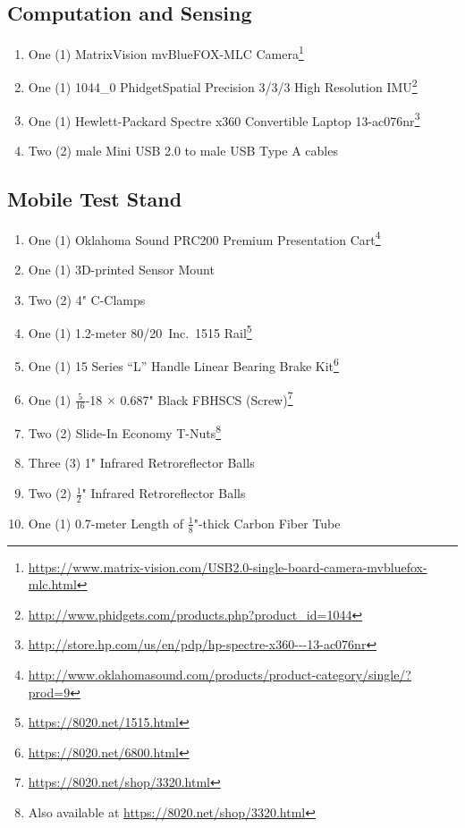\subsection{Computation and Sensing}
\begin{enumerate}
\item One (1) MatrixVision mvBlueFOX-MLC Camera\footnote{\url{https://www.matrix-vision.com/USB2.0-single-board-camera-mvbluefox-mlc.html}}
\item One (1) 1044\_0 PhidgetSpatial Precision 3/3/3 High Resolution IMU\footnote{\url{http://www.phidgets.com/products.php?product_id=1044}}
\item One (1) Hewlett-Packard Spectre x360 Convertible Laptop 13-ac076nr\footnote{\url{http://store.hp.com/us/en/pdp/hp-spectre-x360---13-ac076nr}}
\item Two (2) male Mini USB 2.0 to male USB Type A cables
\end{enumerate}

\subsection{Mobile Test Stand}
\begin{enumerate}
\item One (1) Oklahoma Sound PRC200 Premium Presentation Cart\footnote{\url{http://www.oklahomasound.com/products/product-category/single/?prod=9}}
\item One (1) 3D-printed Sensor Mount
\item Two (2) 4" C-Clamps
\item One (1) 1.2-meter 80/20\textsuperscript{\textregistered}~Inc.\ 1515 Rail\footnote{\url{https://8020.net/1515.html}}
\item One (1) 15 Series ``L'' Handle Linear Bearing Brake Kit\footnote{\url{https://8020.net/6800.html}}
\item One (1) $\frac{5}{16}$-18 $\times$ 0.687" Black FBHSCS (Screw)\footnote{\url{https://8020.net/shop/3320.html}}
\item Two (2) Slide-In Economy T-Nuts\footnote{Also available at \url{https://8020.net/shop/3320.html}}
\item Three (3) 1" Infrared Retroreflector Balls
\item Two (2) $\frac{1}{2}$" Infrared Retroreflector Balls
\item One (1) 0.7-meter Length of $\frac{1}{8}$"-thick Carbon Fiber Tube
\end{enumerate}
